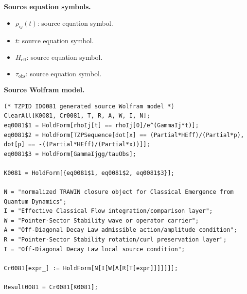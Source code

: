 \begin{minipage}[t]{0.49\linewidth}
\begingroup
\small
\raggedright
\textbf{Source equation symbols.}\par
\begin{itemize}[leftmargin=1.35em,itemsep=1pt,topsep=1pt,parsep=0pt]
    \item $\rho_{ij}(t)$: source equation symbol.
    \item $t$: source equation symbol.
    \item $H_{\mathrm{eff}}$: source equation symbol.
    \item $\tau_{\mathrm{obs}}$: source equation symbol.
\end{itemize}
\endgroup
\end{minipage}\hfill
\begin{minipage}[t]{0.47\linewidth}
\begingroup
\scriptsize
\raggedright
\textbf{Source Wolfram model.}\par
\begin{Verbatim}[fontsize=\tiny,breaklines=true,breakanywhere=true]
(* TZPID ID0081 generated source Wolfram model *)
ClearAll[K0081, Cr0081, T, R, A, W, I, N];
eq0081$1 = HoldForm[rhoIj[t] == rhoIj[0]/e^(GammaIj*t)];
eq0081$2 = HoldForm[TZPSequence[dot[x] == (Partial*HEff)/(Partial*p), dot[p] == -((Partial*HEff)/(Partial*x))]];
eq0081$3 = HoldForm[GammaIjgg/tauObs];

K0081 = HoldForm[{eq0081$1, eq0081$2, eq0081$3}];

N = "normalized TRAWIN closure object for Classical Emergence from Quantum Dynamics";
I = "Effective Classical Flow integration/comparison layer";
W = "Pointer-Sector Stability wave or operator carrier";
A = "Off-Diagonal Decay Law admissible action/amplitude condition";
R = "Pointer-Sector Stability rotation/curl preservation layer";
T = "Off-Diagonal Decay Law local source condition";

Cr0081[expr_] := HoldForm[N[I[W[A[R[T[expr]]]]]]];

Result0081 = Cr0081[K0081];
\end{Verbatim}
\endgroup
\end{minipage}

